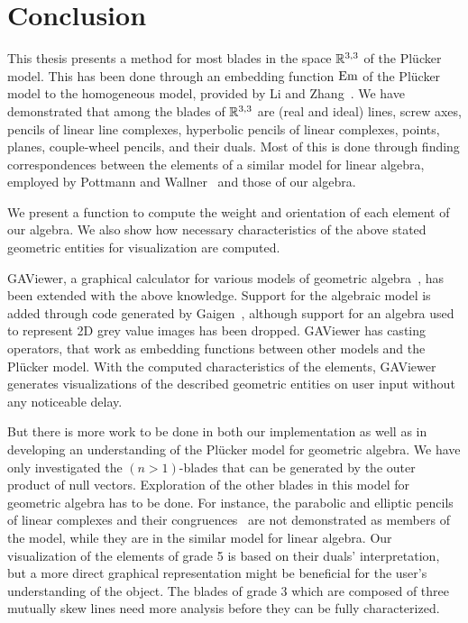 \section{Conclusion}
\label{ch:conclusion}
This thesis presents a method for most blades in the space $\mathbb{R}^{3,3}$ of the Pl\"ucker model.  This has been done through an embedding function $\operatorname{Em}$ of the Pl\"ucker model to the homogeneous model, provided by Li and Zhang~\cite{Hongbo}.  We have demonstrated that among the blades of $\mathbb{R}^{3,3}$ are (real and ideal) lines, screw axes, pencils of linear line complexes, hyperbolic pencils of linear complexes, points, planes, couple-wheel pencils, and their duals.  Most of this is done through finding correspondences between the elements of a similar model for linear algebra, employed by Pottmann and Wallner~\cite{Pottmann} and those of our algebra.

We present a function to compute the weight and orientation of each element of our algebra.  We also show how necessary characteristics of the above stated geometric entities for visualization are computed.

GAViewer, a graphical calculator for various models of geometric algebra~\cite{GAViewer}, has been extended with the above knowledge.  Support for the algebraic model is added through code generated by Gaigen~\cite{Gaigen}, although support for an algebra used to represent 2D grey value images has been dropped.  GAViewer has casting operators, that work as embedding functions between other models and the Pl\"ucker model.  With the computed characteristics of the elements, GAViewer generates visualizations of the described geometric entities on user input without any noticeable delay.


But there is more work to be done in both our implementation as well as in developing an understanding of the Pl\"ucker model for geometric algebra.  We have only investigated the $(n>1)$-blades that can be generated by the outer product of null vectors.  Exploration of the other blades in this model for geometric algebra has to be done.  For instance, the parabolic and elliptic pencils of linear complexes and their congruences~\cite[Section 3.2.1]{Pottmann} are not demonstrated as members of the model, while they are in the similar model for linear algebra.  Our visualization of the elements of grade 5 is based on their duals' interpretation, but a more direct graphical representation might be beneficial for the user's understanding of the object.  The blades of grade 3 which are composed of three mutually skew lines need more analysis before they can be fully characterized.  

